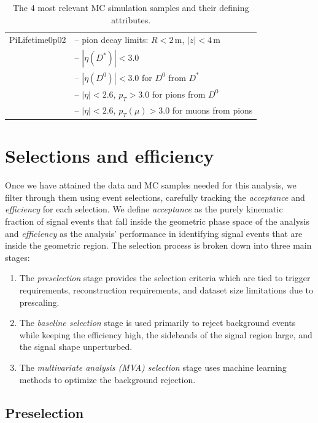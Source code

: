 \begin{table}
\begin{tabular}{|p{3.2cm}|p{12cm}|}
    PiLifetime0p02 & -- pion decay limits: $R < 2$\,m, $|z| < 4$\,m \\
    & -- $|\eta(D^*)| < 3.0$ \\
    & -- $|\eta(D^0)| < 3.0$ for $D^0$ from $D^*$ \\
    & -- $|\eta| < 2.6$, $p_T > 3.0$ for pions from $D^0$ \\
    & -- $|\eta| < 2.6$, $p_T(\mu) > 3.0$ for muons from pions \\
    \hline
\end{tabular}
\caption{The 4 most relevant MC simulation samples and their defining attributes.}
\label{tab:mc-samples}
\end{table}

\section{Selections and efficiency}
\label{sec:selections_and_efficency}

Once we have attained the data and MC samples needed for this analysis, we filter through them using event selections, carefully tracking the \textit{acceptance} and \textit{efficiency} for each selection. We define \textit{acceptance} as the purely kinematic fraction of signal events that fall inside the geometric phase space of the analysis and \textit{efficiency} as the analysis' performance in identifying signal events that are inside the geometric region. The selection process is broken down into three main stages:
\begin{enumerate}
    \item The \textit{preselection} stage provides the selection criteria which are tied to trigger requirements, reconstruction requirements, and dataset size limitations due to prescaling.
    \item The \textit{baseline selection} stage is used primarily to reject background events while keeping the efficiency high, the sidebands of the signal region large, and the signal shape unperturbed. 
    \item The \textit{multivariate analysis (MVA) selection} stage uses machine learning methods to optimize the background rejection.
\end{enumerate}

\subsection{Preselection}
\label{subsec:preselection}

